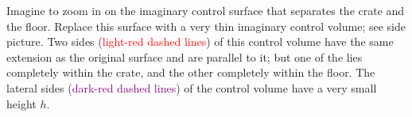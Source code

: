 \documentclass[a4paper,12pt,%
onecolumn,oneside,titlepage,%
british%
]{memoir}
\renewcommand*{\|}[1][]{\nonscript\:#1\vert\nonscript\:\mathopen{}}
\begin{document}
Imagine to zoom in on the imaginary control surface that separates the crate and the floor. Replace this surface with a very thin imaginary control volume; see side picture. Two sides (\textcolor{red}{light-red dashed lines}) of this control volume have the same extension as the original surface and are parallel to it; but one of the lies completely within the crate, and the other completely within the floor. The lateral sides (\textcolor{purple}{dark-red dashed lines}) of the control volume have a very small height $h$.
%
%
\end{document}
